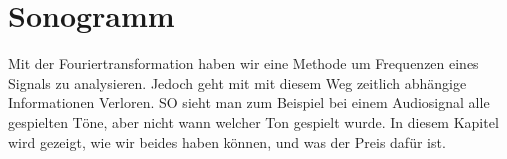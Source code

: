 %
%
%
%
\chapter{Sonogramm\label{chapter:sonogramm}}
\begin{refsection}

Mit der Fouriertransformation haben wir eine Methode um Frequenzen eines Signals zu analysieren.
Jedoch geht mit mit diesem Weg zeitlich abhängige Informationen Verloren.
SO sieht man zum Beispiel bei einem Audiosignal alle gespielten Töne, aber nicht wann welcher Ton gespielt wurde.
In diesem Kapitel wird gezeigt, wie wir beides haben können, und was der Preis dafür ist.







\printbibliography[heading=subbibliography]
\end{refsection}
